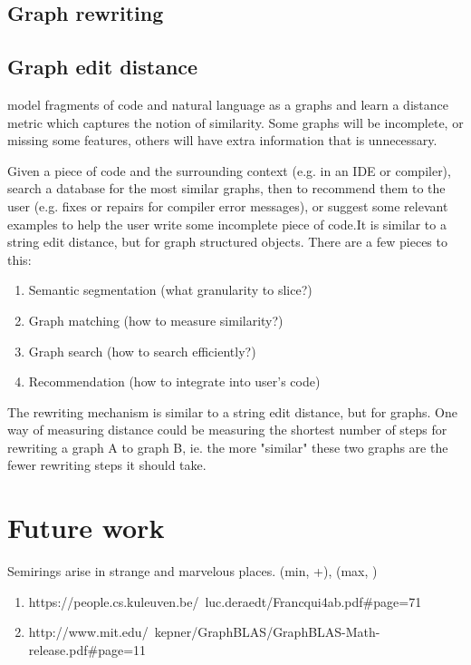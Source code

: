 \documentclass[11pt]{article}
\begin{document}
    \subsection{Graph rewriting}

    \subsection{Graph edit distance}

    model fragments of code and natural language as a graphs and learn a distance metric which captures the notion of similarity. Some graphs will be incomplete, or missing some features, others will have extra information that is unnecessary.

    Given a piece of code and the surrounding context (e.g. in an IDE or compiler), search a database for the most similar graphs, then to recommend them to the user (e.g. fixes or repairs for compiler error messages), or suggest some relevant examples to help the user write some incomplete piece of code.It is similar to a string edit distance, but for graph structured objects. There are a few pieces to this:

    \begin{enumerate}
    \item Semantic segmentation (what granularity to slice?)
    \item Graph matching (how to measure similarity?)
    \item Graph search (how to search efficiently?)
    \item Recommendation (how to integrate into user's code)
    \end{enumerate}

    The rewriting mechanism is similar to a string edit distance, but for graphs. One way of measuring distance could be measuring the shortest number of steps for rewriting a graph A to graph B, ie. the more "similar" these two graphs are the fewer rewriting steps it should take.

    \section{Future work}

    Semirings arise in strange and marvelous places. (min, +), (max, \times)

    \begin{enumerate}
    \item https://people.cs.kuleuven.be/~luc.deraedt/Francqui4ab.pdf#page=71
    \item http://www.mit.edu/~kepner/GraphBLAS/GraphBLAS-Math-release.pdf#page=11
    \end{enumerate}

    
    
\end{document}
